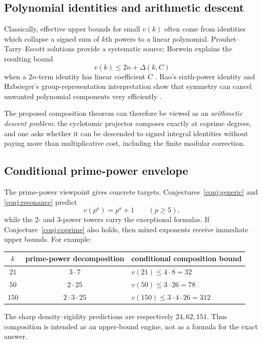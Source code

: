 \documentclass[../Axiomathic.tex]{subfiles}
\begin{document}
\subsection{Polynomial identities and arithmetic descent}

Classically, effective upper bounds for small $v(k)$ often come from identities which collapse a signed sum of $k$th powers to a linear polynomial.  Prouhet--Tarry--Escott solutions provide a systematic source; Borwein explains the resulting bound
\[
  v(k)\le 2n+\Delta(k,C)
\]
when a $2n$-term identity has linear coefficient $C$ \cite{Borwein2002}.  Rao's sixth-power identity and Habsieger's group-representation interpretation show that symmetry can cancel unwanted polynomial components very efficiently \cite{Rao1938,Habsieger1991}.

The proposed composition theorem can therefore be viewed as an \emph{arithmetic descent problem}: the cyclotomic projector composes exactly at coprime degrees, and one asks whether it can be descended to signed integral identities without paying more than multiplicative cost, including the finite modular correction.

\subsection{Conditional prime-power envelope}

The prime-power viewpoint gives concrete targets.  Conjectures~\ref{conj:generic} and \ref{conj:resonance} predict
\[
  v(p^a)=p^a+1\qquad(p\ge5),
\]
while the $2$- and $3$-power towers carry the exceptional formulas.  If Conjecture~\ref{conj:coprime} also holds, then mixed exponents receive immediate upper bounds.  For example:
\begin{center}
\begin{tabular}{ccl}
\toprule
$k$ & prime-power decomposition & conditional composition bound \\
\midrule
$21$ & $3\cdot7$ & $v(21)\le4\cdot8=32$ \\
$50$ & $2\cdot25$ & $v(50)\le3\cdot26=78$ \\
$150$ & $2\cdot3\cdot25$ & $v(150)\le3\cdot4\cdot26=312$ \\
\bottomrule
\end{tabular}
\end{center}
The sharp density--rigidity predictions are respectively $24,62,151$.  Thus composition is intended as an upper-bound engine, not as a formula for the exact answer.
\end{document}
